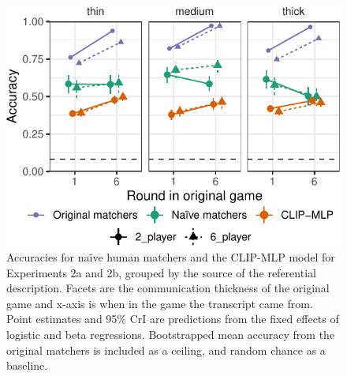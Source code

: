 \documentclass[10pt, letterpaper]{article}
\begin{document}
\begin{CodeChunk}
\begin{figure}[t]

{\centering \includegraphics[width=0.9\linewidth]{figs/fig-condition-1} 

}

\caption[Accuracies for naïve human matchers and the CLIP-MLP model for Experiments 2a and 2b, grouped by the source of the referential description]{Accuracies for naïve human matchers and the CLIP-MLP model for Experiments 2a and 2b, grouped by the source of the referential description. Facets are the communication thickness of the original game and x-axis is when in the game the transcript came from. Point estimates and 95\% CrI are predictions from the fixed effects of logistic and beta regressions. Bootstrapped mean accuracy from the original matchers is included as a ceiling, and random chance as a baseline. \label{expt2-condition}}\label{fig:fig-condition}
\end{figure}
\end{CodeChunk}
\end{document}
